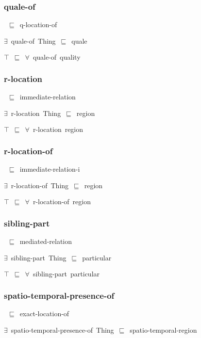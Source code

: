 \documentclass{article}
\begin{document}
\subsubsection*{quale-of}

~\ensuremath{\sqsubseteq}~q-location-of

\ensuremath{\exists}~quale-of~Thing~\ensuremath{\sqsubseteq}~quale

\ensuremath{\top}~\ensuremath{\sqsubseteq}~\ensuremath{\forall}~quale-of~quality

\subsubsection*{r-location}

~\ensuremath{\sqsubseteq}~immediate-relation

\ensuremath{\exists}~r-location~Thing~\ensuremath{\sqsubseteq}~region

\ensuremath{\top}~\ensuremath{\sqsubseteq}~\ensuremath{\forall}~r-location~region

\subsubsection*{r-location-of}

~\ensuremath{\sqsubseteq}~immediate-relation-i

\ensuremath{\exists}~r-location-of~Thing~\ensuremath{\sqsubseteq}~region

\ensuremath{\top}~\ensuremath{\sqsubseteq}~\ensuremath{\forall}~r-location-of~region

\subsubsection*{sibling-part}

~\ensuremath{\sqsubseteq}~mediated-relation

\ensuremath{\exists}~sibling-part~Thing~\ensuremath{\sqsubseteq}~particular

\ensuremath{\top}~\ensuremath{\sqsubseteq}~\ensuremath{\forall}~sibling-part~particular

\subsubsection*{spatio-temporal-presence-of}

~\ensuremath{\sqsubseteq}~exact-location-of

\ensuremath{\exists}~spatio-temporal-presence-of~Thing~\ensuremath{\sqsubseteq}~spatio-temporal-region
\end{document}
